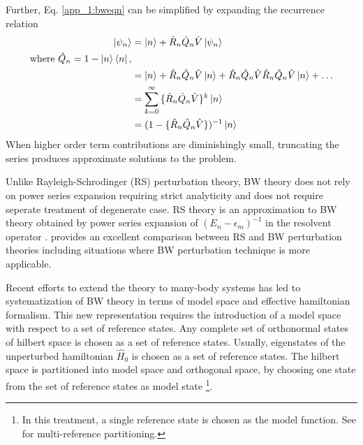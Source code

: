 Further, Eq. \eqref{app_1:bweqn} can be simplified by expanding the recurrence relation
\begin{align}
 \ket{\psi_n} &= \ket{n} + \hat{R}_{n}\hat{Q}_{n}\hat{V}\ket{\psi_n} \nonumber\\
 \text{where } \hat{Q}_{n} = \mathrm{1} - \ket{n}\bra{n}, \nonumber\\
 &= \ket{n} + \hat{R}_{n}\hat{Q}_{n}\hat{V}\ket{n} + \hat{R}_{n}\hat{Q}_{n}\hat{V}\hat{R}_{n}\hat{Q}_{n}\hat{V}\ket{n} + \dots \nonumber\\
 &= \sum_{k=0}^{\infty}{\{\hat{R}_{n}\hat{Q}_{n}\hat{V}\}^k \ket{n}} \nonumber\\ 
 &= (\mathrm{1} - \{\hat{R}_{n}\hat{Q}_{n}\hat{V}\})^{-1} \ket{n}
\end{align}
When higher order term contributions are diminishingly small, truncating the series produces approximate solutions 
to the problem.

Unlike Rayleigh-Schrodinger (RS) perturbation theory, BW theory does not rely on power series expansion requiring strict 
analyticity and does not require seperate treatment of degenerate case. RS theory is an approximation to BW theory 
obtained by power series expansion of $(E_n - \epsilon_m)^{-1}$ in the resolvent operator \cite{wilson2009brillouin}. 
\parencite{silvert1972comparison} provides an excellent comparison between RS and BW perturbation 
theories including situations where BW perturbation technique is more applicable.

Recent efforts to extend the theory to many-body systems has led to systematization of BW theory in 
terms of model space and effective hamiltonian formalism. This new representation requires the
introduction of a model space with respect to a set of reference states. Any complete set of orthonormal states of hilbert space 
is chosen as a set of reference states. Usually, eigenstates of the unperturbed hamiltonian $\hat{H}_{0}$ is chosen as a set of 
reference states. The hilbert space is partitioned into model space and orthogonal space, by choosing one state from the set of
reference states as model state \footnote{In this treatment, a single reference state is chosen as the model function. See 
\cite{wilson2009brillouin} for multi-reference partitioning.}.

